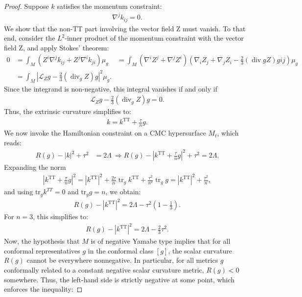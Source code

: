 \documentclass{amsart}
\newcommand{\tr}{\mbox{tr}}
\begin{document}
\begin{proof}
\noindent Suppose $k$ satisfies the momentum constraint:
\begin{align}
\nabla^j k_{ij} = 0.
\end{align}
We show that the non-TT part involving the vector field Z must vanish. To that end, consider the $L^{2}$-inner product of the momentum constraint with the vector field Z, and apply Stokes’ theorem:
\begin{align}
0 &= \int_M \left(Z^i \nabla^j k_{ij} + Z^j \nabla^i k_{ji} \right) \mu_g \nonumber \
&= \int_M (\nabla^i Z^j + \nabla^j Z^i)\left( \nabla_i Z_j + \nabla_j Z_i - \frac{2}{3} (\operatorname{div}g Z) g{ij} \right) \mu_g \\\nonumber 
&= \int_M \left| \mathscr{L}_Z g - \frac{2}{3} (\operatorname{div}_g Z) g \right|^2  \mu_g.
\end{align}
Since the integrand is non-negative, this integral vanishes if and only if
\begin{align}
\mathscr{L}_Z g - \frac{2}{3} (\operatorname{div}_g Z) g = 0.
\end{align}
Thus, the extrinsic curvature simplifies to:
\begin{align}
k = k^{\mathrm{TT}} + \frac{\tau}{n}g.
\end{align}
We now invoke the Hamiltonian constraint on a CMC hypersurface $M_{t}$, which reads:
\begin{align}
R(g) - |k|^2 + \tau^2 &= 2\Lambda \
\Rightarrow R(g) - \left| k^{\mathrm{TT}} + \frac{\tau}{n}g \right|^2 + \tau^2 = 2\Lambda.
\end{align}
Expanding the norm
\begin{align}
|k^{\mathrm{TT}} + \frac{\tau}{n}g|^2 = |k^{\mathrm{TT}}|^2 + \frac{2\tau}{n} \operatorname{tr}_g k^{\mathrm{TT}} + \frac{\tau^2}{n^{2}} \operatorname{tr}_g g = |k^{\mathrm{TT}}|^2 + \frac{\tau^2}{n},
\end{align}
and using $\tr_{g}k^{TT}=0$ and $\tr_{g}g=n$, we obtain:
\begin{align}
R(g) - |k^{\mathrm{TT}}|^2 = 2\Lambda - \tau^2\left(1 - \frac{1}{3}\right).
\end{align}
For $n=3$, this simplifies to:
\begin{align}
R(g) - |k^{\mathrm{TT}}|^2 = 2\Lambda - \frac{2}{3}\tau^2.
\end{align}
Now, the hypothesis that $M$ is of negative Yamabe type implies that for all conformal representatives $g$ in the conformal class $[g]$, the scalar curvature $R(g)$ cannot be everywhere nonnegative. In particular, for all metrics $g$ conformally related to a constant negative scalar curvature metric, $R(g)<0$ somewhere. Thus, the left-hand side is strictly negative at some point, which enforces the inequality:

\end{proof}
\end{document}

